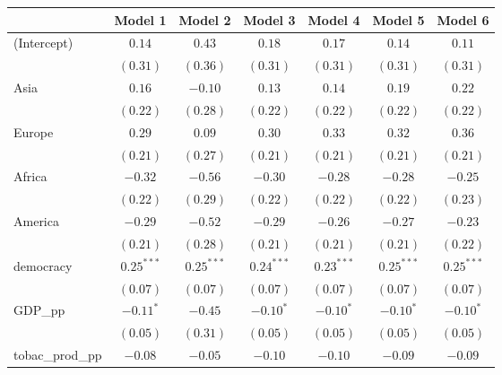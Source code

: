 
\begin{table}[!h]
\begin{center}
\begin{tabular}{l c c c c c c }
\toprule
 & Model 1 & Model 2 & Model 3 & Model 4 & Model 5 & Model 6 \\
\midrule
(Intercept)             & $0.14$       & $0.43$       & $0.18$       & $0.17$       & $0.14$       & $0.11$       \\
                        & $(0.31)$     & $(0.36)$     & $(0.31)$     & $(0.31)$     & $(0.31)$     & $(0.31)$     \\
Asia                    & $0.16$       & $-0.10$      & $0.13$       & $0.14$       & $0.19$       & $0.22$       \\
                        & $(0.22)$     & $(0.28)$     & $(0.22)$     & $(0.22)$     & $(0.22)$     & $(0.22)$     \\
Europe                  & $0.29$       & $0.09$       & $0.30$       & $0.33$       & $0.32$       & $0.36$       \\
                        & $(0.21)$     & $(0.27)$     & $(0.21)$     & $(0.21)$     & $(0.21)$     & $(0.21)$     \\
Africa                  & $-0.32$      & $-0.56$      & $-0.30$      & $-0.28$      & $-0.28$      & $-0.25$      \\
                        & $(0.22)$     & $(0.29)$     & $(0.22)$     & $(0.22)$     & $(0.22)$     & $(0.23)$     \\
America                 & $-0.29$      & $-0.52$      & $-0.29$      & $-0.26$      & $-0.27$      & $-0.23$      \\
                        & $(0.21)$     & $(0.28)$     & $(0.21)$     & $(0.21)$     & $(0.21)$     & $(0.22)$     \\
democracy               & $0.25^{***}$ & $0.25^{***}$ & $0.24^{***}$ & $0.23^{***}$ & $0.25^{***}$ & $0.25^{***}$ \\
                        & $(0.07)$     & $(0.07)$     & $(0.07)$     & $(0.07)$     & $(0.07)$     & $(0.07)$     \\
GDP\_pp                 & $-0.11^{*}$  & $-0.45$      & $-0.10^{*}$  & $-0.10^{*}$  & $-0.10^{*}$  & $-0.10^{*}$  \\
                        & $(0.05)$     & $(0.31)$     & $(0.05)$     & $(0.05)$     & $(0.05)$     & $(0.05)$     \\
tobac\_prod\_pp         & $-0.08$      & $-0.05$      & $-0.10$      & $-0.10$      & $-0.09$      & $-0.09$      \\

\end{tabular}
\end{center}
\end{table}
